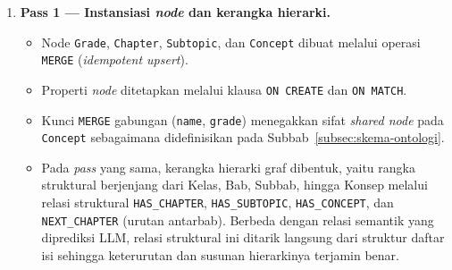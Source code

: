 \documentclass[../../thesis]{subfiles}
\begin{document}
\begin{enumerate}
  \item \textbf{Pass 1 --- Instansiasi \textit{node} dan kerangka hierarki.}
  \begin{itemize}
    \item Node \texttt{Grade}, \texttt{Chapter}, \texttt{Subtopic}, dan
      \texttt{Concept} dibuat melalui operasi \texttt{MERGE}
      (\textit{idempotent upsert}).
    \item Properti \textit{node} ditetapkan melalui klausa \texttt{ON CREATE} dan
      \texttt{ON MATCH}.
    \item Kunci \texttt{MERGE} gabungan (\texttt{name}, \texttt{grade}) menegakkan
      sifat \textit{shared \textit{node}} pada \texttt{Concept} sebagaimana didefinisikan
      pada Subbab~\ref{subsec:skema-ontologi}.
    \item Pada \textit{pass} yang sama, kerangka hierarki graf dibentuk, yaitu
      rangka struktural berjenjang dari Kelas, Bab, Subbab, hingga Konsep melalui
      relasi struktural \texttt{HAS\_CHAPTER}, \texttt{HAS\_SUBTOPIC},
      \texttt{HAS\_CONCEPT}, dan \texttt{NEXT\_CHAPTER} (urutan antarbab). Berbeda
      dengan relasi semantik yang diprediksi LLM, relasi struktural ini ditarik
      langsung dari struktur daftar isi sehingga keterurutan dan susunan
      hierarkinya terjamin benar.
  \end{itemize}


\end{enumerate}
\end{document}
